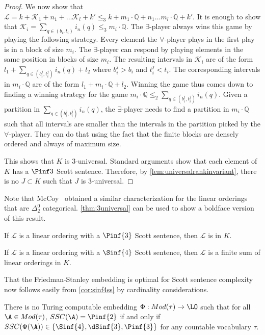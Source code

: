 \documentclass{amsart}
\newcommand{\Q}{\mathbb{Q}}
\newcommand{\K}{\mathcal{K}}
\renewcommand{\L}{\mathcal{L}}
\begin{document}
\begin{proof}
We now show that $\L=k+\K_1+n_1+\dots
\K_l+k'\leq_3 k+m_1\cdot \Q+n_1\dots m_l\cdot \Q+k'$.
It is enough to show that $\K_i=\sum_{q\in(b_i,t_i)}i_n(q) \leq_3 m_i\cdot\Q$.
The $\exists$-player always wins this game by playing the following strategy.
Every element the $\forall$-player plays in the first play is in a block of size
$m_i$. The $\exists$-player can respond by playing elements in the same position
in blocks of size $m_i$. The resulting intervals in $\K_i$ are of the form
$l_1+\sum_{q\in (b_i^j,t_i^j)}i_n(q)+l_2$ where $b_i^j> b_i$ and $t_i^j<t_i$.
The corresponding intervals in $m_i\cdot \Q$ are of the form $l_1+m_i\cdot
\Q+l_2$. Winning the game thus comes down to finding a winning strategy for the
game $m_i\cdot \Q\leq_2 \sum_{q\in (b_i^j,t_i^j)}i_n(q)$. Given a partition in
$\sum_{q\in (b_i^j,t_i^j)}i_n(q)$, the $\exists$-player needs to find a
partition in $m_i\cdot \Q$ such that all intervals are smaller than the intervals
in the partition picked by the $\forall$-player. They can do
that using the fact that the finite blocks are densely ordered and always of maximum size.

This shows that $K$ is $3$-universal. Standard arguments show that each
element of $K$ has a $\Pinf3$ Scott sentence. Therefore, by \cref{lem:universalrankinvariant},
there is no $J\subset K$ such that $J$ is $3$-universal.
\end{proof}
Note that McCoy~\cite{mccoy2003} obtained a similar characterization for the linear orderings that are
$\Delta^0_2$ categorical. \cref{thm:3universal} can be used to show a boldface
version of this result.
\begin{corollary}\label{cor:pinf3ss}
  If $\L$ is a linear ordering with a $\Pinf{3}$ Scott sentence, then $\L$ is in
  $K$. 
\end{corollary}
\begin{corollary}\label{cor:sinf4ss}
  If $\L$ is a linear ordering with a $\Sinf{4}$ Scott sentence, then $\L$ is a
  finite sum of linear orderings in $K$.
\end{corollary}
That the Friedman-Stanley embedding is optimal for Scott sentence
complexity now follows easily from \cref{cor:sinf4ss} by cardinality
considerations.
\begin{theorem}\label{thm:optimalembedding}
   There is no Turing computable embedding $\Phi:Mod(\tau)
   \to \LO$ such that for all $\A\in Mod(\tau)$, $SSC(\A)=\Pinf{2}$ if and only
   if $SSC(\Phi(\A))\in\{ \Sinf{4}, \dSinf{3}, \Pinf{3}\}$ for any countable
   vocabulary $\tau$.
\end{theorem}
\end{document}
